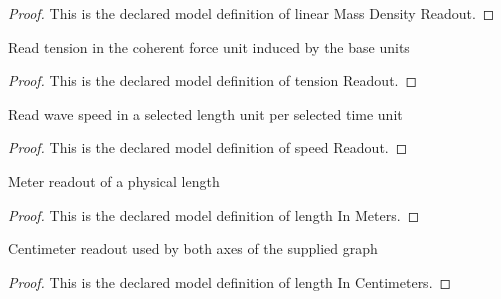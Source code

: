 \begin{proof}
  This is the declared model definition of linear Mass Density Readout.
\end{proof}
\begin{definition}
  \label{def:physics:phyx-mini-0291:phyxminiproblems-problemphyxmini0291-tensionreadout}
  Read tension in the coherent force unit induced by the base units
\end{definition}
\begin{proof}
  This is the declared model definition of tension Readout.
\end{proof}
\begin{definition}
  \label{def:physics:phyx-mini-0291:phyxminiproblems-problemphyxmini0291-speedreadout}
  Read wave speed in a selected length unit per selected time unit
\end{definition}
\begin{proof}
  This is the declared model definition of speed Readout.
\end{proof}
\begin{definition}
  \label{def:physics:phyx-mini-0291:phyxminiproblems-problemphyxmini0291-lengthinmeters}
  Meter readout of a physical length
\end{definition}
\begin{proof}
  This is the declared model definition of length In Meters.
\end{proof}
\begin{definition}
  \label{def:physics:phyx-mini-0291:phyxminiproblems-problemphyxmini0291-lengthincentimeters}
  Centimeter readout used by both axes of the supplied graph
\end{definition}
\begin{proof}
  This is the declared model definition of length In Centimeters.
\end{proof}

